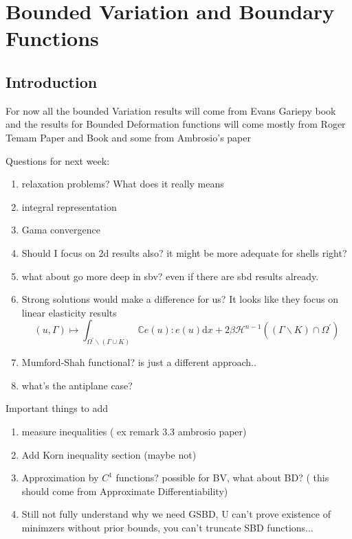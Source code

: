 \chapter{Bounded Variation and Boundary Functions}

\section{Introduction}

For now all the bounded Variation results will come from Evans Gariepy book \cite{evansGa} and the results for Bounded Deformation functions will come mostly from Roger Temam Paper and Book \cite{RogerPaper,RogerBook} and some from Ambrosio's paper \cite{Ambrosio1997}
\begin{question}
Questions for next week:
\begin{enumerate}
\item relaxation problems? What  does it really means
\item integral representation
\item  Gama convergence
\item Should I focus on 2d results also? it might be more adequate for shells right?
\item what about go more deep in sbv? even if there are sbd results already.
\item Strong solutions would make a difference for us? It looks like they focus on linear elasticity results $$(u, \Gamma) \mapsto \int_{\Omega^{\prime} \backslash(\Gamma \cup K)} \mathbb{C} e(u): e(u) \mathrm{d} x+2 \beta \mathcal{H}^{n-1}\left((\Gamma \backslash K) \cap \Omega^{\prime}\right)$$
\item Mumford-Shah functional? is just a different approach..
\item what's the antiplane case?
\end{enumerate}
\end{question}

\begin{com}
Important things to add
\begin{enumerate}
    \item measure inequalities ( ex remark 3.3 ambrosio paper)
    \item Add Korn inequality section (maybe not)
    \item Approximation by $C^1$ functions? possible for BV, what about BD? ( this should come from Approximate Differentiability)
    \item Still not fully understand why we need GSBD, U can't prove existence of minimzers without prior bounds, you can't truncate SBD functions...
\end{enumerate}
\end{com}
